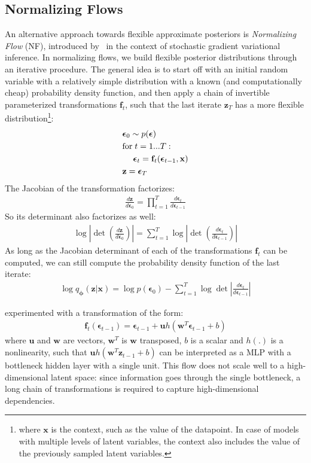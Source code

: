 \documentclass[MAL,biber]{nowfnt} %
\newcommand{\bb}[1]{\mathbf{#1}}
\newcommand{\bx}{\bb{x}}
\newcommand{\bw}{\bb{w}}
\newcommand{\bz}{\bb{z}}
\newcommand{\bphi}{\boldsymbol{\phi}}
\newcommand{\beps}{\boldsymbol{\epsilon}}
\newcommand{\qP}{q_{\bphi}}
\begin{document}
\subsection{Normalizing Flows}
An alternative approach towards flexible approximate posteriors is \emph{Normalizing Flow} (NF), introduced by~\citep{rezende2015variational} in the context of stochastic gradient variational inference. In normalizing flows, we build flexible posterior distributions through an iterative procedure. The general idea is to start off with an initial random variable with a relatively simple distribution with a known (and computationally cheap) probability density function, and then apply a chain of invertible parameterized transformations $\mathbf{f}_t$, such that the last iterate $\bz_T$ has a more flexible distribution\footnote{where $\bx$ is the context, such as the value of the datapoint. In case of models with multiple levels of latent variables, the context also includes the value of the previously sampled latent variables.}:
\begin{align}
&\beps_0 \sim p(\beps)\\
&\text{for\;} t = 1 ... T:\\
&\quad\; \beps_t = \mathbf{f}_t(\beps_{t-1},\bx)\\
&\bz = \beps_T
\end{align}
The Jacobian of the transformation factorizes:
\begin{align}
\frac{d\bz}{d\beps_{0}} = \prod_{t=1}^T \frac{d\beps_t}{d\beps_{t-1}}
\end{align}
So its determinant also factorizes as well:
\begin{align}
\log \left|\det\left(\frac{d\bz}{d\beps_{0}}\right)\right| = \sum_{t=1}^T \log \left|\det\left(\frac{d\beps_t}{d\beps_{t-1}}\right)\right|
\end{align}
As long as the Jacobian determinant of each of the transformations $\mathbf{f}_t$ can be computed, we can still compute the probability density function of the last iterate:
\begin{align}
\log \qP(\bz|\bx) = \log p(\beps_0) - \sum_{t=1}^T \log \det \left| \frac{d\beps_t}{d\beps_{t-1}} \right|
\label{eq:nf_it}
\end{align}

\cite{rezende2015variational} experimented with a transformation of the form:
\begin{align}
\mathbf{f}_t(\beps_{t-1}) = \beps_{t-1} + \mathbf{u}h(\bw^T\beps_{t-1}+b)
\label{eq:planarflow}
\end{align}
where $\mathbf{u}$ and $\bw$ are vectors, $\bw^T$ is $\bw$ transposed, $b$ is a scalar and $h(.)$ is a nonlinearity, such that $\mathbf{u}h(\bw^T\bz_{t-1}+b)$ can be interpreted as a MLP with a bottleneck hidden layer with a single unit. This flow does not scale well to a high-dimensional latent space: since information goes through the single bottleneck, a long chain of transformations is required to capture high-dimensional dependencies. 
\end{document}
